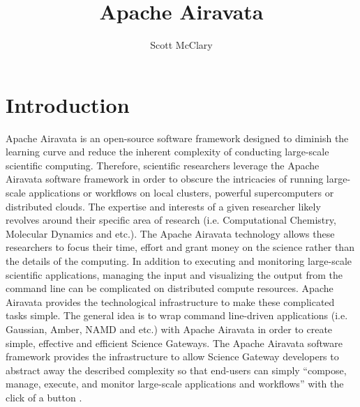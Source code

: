 \documentclass[9pt,twocolumn,twoside]{../../styles/osajnl}
\title{Apache Airavata}
\author[1,*]{Scott McClary}
\affil[1]{School of Informatics and Computing, Bloomington, IN 47408, U.S.A.}
\affil[*]{Corresponding authors: scmcclar@indiana.edu}
\begin{document}
\maketitle

\section{Introduction} \label{introduction}
Apache Airavata is an open-source software framework designed to
diminish the learning curve and reduce the inherent complexity of
conducting large-scale scientific computing. Therefore, scientific
researchers leverage the Apache Airavata software framework in order
to obscure the intricacies of running large-scale applications or
workflows on local clusters, powerful supercomputers or distributed
clouds. The expertise and interests of a given researcher likely
revolves around their specific area of research (i.e. Computational
Chemistry, Molecular Dynamics and etc.). The Apache Airavata
technology allows these researchers to focus their time, effort and
grant money on the science rather than the details of the
computing. In addition to executing and monitoring large-scale
scientific applications, managing the input and visualizing the output
from the command line can be complicated on distributed compute
resources. Apache Airavata provides the technological infrastructure
to make these complicated tasks simple. The general idea is to wrap
command line-driven applications (i.e. Gaussian, Amber, NAMD and etc.)
with Apache Airavata in order to create simple, effective and
efficient Science Gateways. The Apache Airavata software framework
provides the infrastructure to allow Science Gateway developers to
abstract away the described complexity so that end-users can simply
``compose, manage, execute, and monitor large-scale applications and
workflows'' with the click of a button \cite{www-airavata}.
\end{document}
